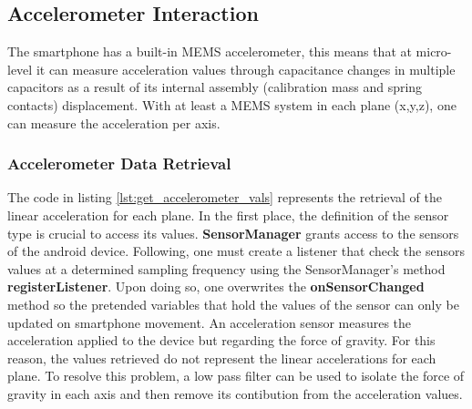 \subsection{Accelerometer Interaction}%
\label{sec:accelerometer-access}
%
The smartphone has a built-in MEMS accelerometer, this means that at micro-level it can measure acceleration values through capacitance changes in multiple capacitors as a result of its internal assembly (calibration mass and spring contacts) displacement. With at least a MEMS system in each plane (x,y,z), one can measure the acceleration per axis. 
\subsubsection{Accelerometer Data Retrieval}
\label{sec:accelerometer-data}
%
The code in listing \ref{lst:get_accelerometer_vals} represents the retrieval of the linear acceleration for each plane.
In the first place, the definition of the sensor type is crucial to access its values. \textbf{SensorManager} grants access to the sensors of the android device. Following, one must create a listener that check the sensors values at a determined sampling frequency using the SensorManager's method \textbf{registerListener}. Upon doing so, one overwrites the \textbf{onSensorChanged} method so the pretended variables that hold the values of the sensor can only be updated on smartphone movement.
An acceleration sensor measures the acceleration applied to the device but regarding the force of gravity. For this reason, the values retrieved do not represent the linear accelerations for each plane. To resolve this problem, a low pass filter can be used to isolate the force of gravity in each axis and then remove its contibution from the acceleration values.

%
%